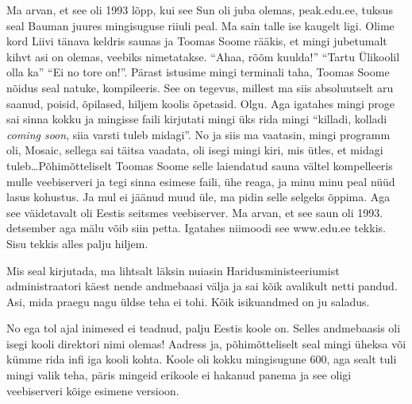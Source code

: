 Ma arvan, et see oli 1993 lõpp, kui see Sun oli juba olemas, peak.edu.ee,  tuksus seal Bauman juures mingisuguse riiuli peal. Ma sain talle ise kaugelt ligi. Olime kord  Liivi tänava keldris saunas ja Toomas Soome rääkis, et  mingi jubetumalt kihvt asi on olemas, veebiks nimetatakse. \enquote{Ahaa, rõõm kuulda!} \enquote{Tartu Ülikoolil olla ka} \enquote{Ei no tore on!}. Pärast istusime mingi terminali taha, Toomas Soome nõidus seal natuke, kompileeris. See on tegevus, millest ma siis absoluutselt aru saanud, poisid, õpilased, hiljem koolis õpetasid. Olgu. Aga igatahes mingi proge sai sinna kokku ja  mingisse faili kirjutati mingi üks rida mingi \enquote{killadi, kolladi \emph{coming soon}, siia varsti tuleb midagi}. No ja siis ma vaatasin, mingi programm oli, Mosaic, sellega sai täitsa vaadata, oli isegi mingi kiri, mis ütles, et midagi tuleb\ldots Põhimõtteliselt Toomas Soome selle laiendatud sauna vältel kompelleeris mulle veebiserveri ja tegi sinna esimese faili, ühe reaga, ja minu minu peal nüüd lasus kohustus. Ja mul ei jäänud muud üle, ma pidin selle selgeks õppima. Aga see väidetavalt oli Eestis seitsmes veebiserver. Ma arvan, et see saun oli 1993. detsember aga mälu võib siin petta. Igatahes niimoodi see www.edu.ee tekkis. Sisu tekkis alles palju hiljem.


Mis seal kirjutada, ma lihtsalt läksin nuiasin Haridusministeeriumist administraatori käest nende andmebaasi välja ja sai kõik avalikult netti pandud. Asi, mida praegu nagu üldse teha ei tohi. Kõik isikuandmed on ju saladus.


No ega tol ajal inimesed ei teadnud, palju Eestis koole on. Selles andmebaasis oli isegi kooli direktori nimi olemas! Aadress ja, põhimõtteliselt seal mingi üheksa või kümme rida infi iga kooli kohta. Koole oli kokku mingisugune 600, aga sealt tuli mingi valik teha, päris mingeid erikoole ei hakanud panema ja see oligi veebiserveri kõige esimene versioon. 

